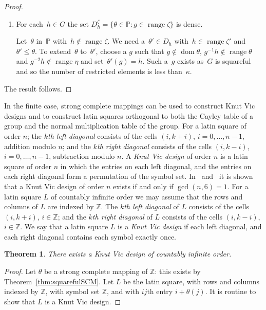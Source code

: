 \documentclass[12pt,a4paper]{article}
\newtheorem{thm}{Theorem}[section]
\DeclareMathOperator{\dom}{dom}
\DeclareMathOperator{\ran}{range}
\renewcommand{\P}{\mathbb{P}}
\begin{document}
\begin{proof}
\begin{enumerate}
\item For each~$h \in G$ the set  $D_h^{\zeta} = \{ \theta \in \P : g \in \ran \zeta \}$ is dense.

Let~$\theta$ in~$\P$ with~$h \not\in \ran \zeta$.  We need a~$\theta' \in D_h$ with~$h \in \ran \zeta'$ and $\theta' \leq \theta$.
To extend~$\theta$ to~$\theta'$,  choose a $g$ such that $g \not\in \dom \theta$, $g^{-1}h \not\in \ran \theta$ and $g^{-2}h \not\in \ran \eta$ and set~$\theta'(g) = h$.  Such a~$g$ exists as~$G$ is squareful and so the number of restricted elements is less than~$\kappa$.
\end{enumerate}

The result follows.
\end{proof}

In the finite case, strong complete mappings can be used to construct Knut Vic designs and to construct latin squares orthogonal to both the Cayley table of a group and the normal multiplication table of the group. For a latin square of order $n$; the {\em $k$th left diagonal} consists of the cells $(i,k+i)$, $i=0,\dots,n-1$, addition modulo $n$; and the {\em $k$th right diagonal} consists of the cells $(i,k-i)$, $i=0,\dots,n-1$, subtraction modulo $n$. A {\em Knut Vic design} of order $n$ is a latin square of order $n$ in which the entries on each left diagonal, and the entries on each right diagonal form a permutation of the symbol set. In~\cite{Hedayat:1977} and~\cite{Hedayat/Federer:1975} it is shown that a Knut Vic design of order $n$ exists if and only if $\gcd(n,6)=1$. For a latin square $L$ of countably infinite order we may assume that the rows and columns of $L$ are indexed by $\mathbb{Z}$. The {\em $k$th left diagonal} of $L$ consists of the cells $(i,k+i)$, $i\in\mathbb{Z}$; and the {\em $k$th right diagonal} of $L$ consists of the cells $(i,k-i)$, $i\in\mathbb{Z}$. We say that a latin square $L$ is a {\em Knut Vic design} if each left diagonal, and each right diagonal contains each symbol exactly once.

\begin{thm}
There exists a Knut Vic design of countably infinite order.
\end{thm}
\begin{proof}
Let $\theta$ be a strong complete mapping of $\mathbb{Z}$: this exists by Theorem~\ref{thm:squarefulSCM}. Let $L$ be the latin square, with rows and columns indexed by $\mathbb{Z}$, with symbol set $\mathbb{Z}$, and with $ij$th entry $i+\theta(j)$. It is routine to show that $L$ is a Knut Vic design.
\end{proof}
\end{document}
